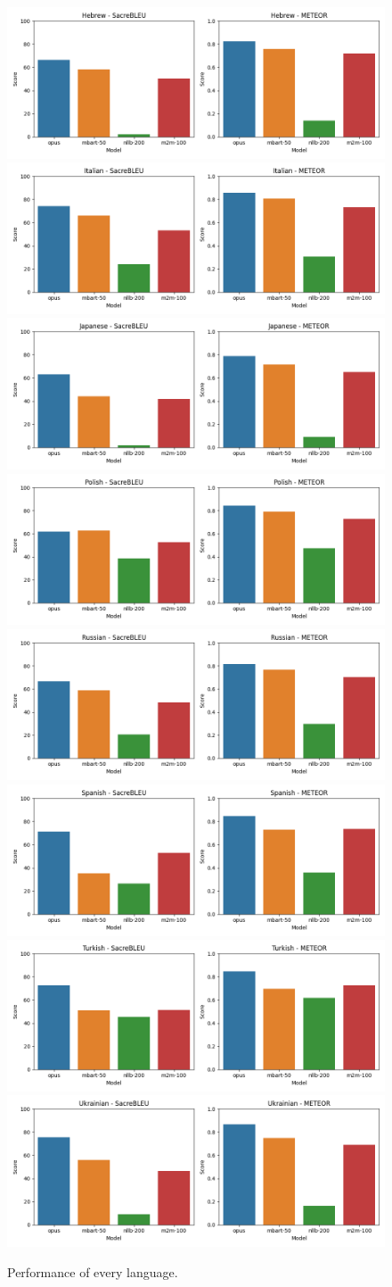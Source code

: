 \documentclass[a4paper]{article}
\begin{document}
\begin{figure}[htbp]
    \includegraphics[width=0.49\linewidth]{figures/hebrew_all_metrics.png}
    \includegraphics[width=0.49\linewidth]{figures/italian_all_metrics.png}
    \includegraphics[width=0.49\linewidth]{figures/japanese_all_metrics.png}
    \includegraphics[width=0.49\linewidth]{figures/polish_all_metrics.png}
    \includegraphics[width=0.49\linewidth]{figures/russian_all_metrics.png}
    \includegraphics[width=0.49\linewidth]{figures/spanish_all_metrics.png}
    \includegraphics[width=0.49\linewidth]{figures/turkish_all_metrics.png}
    \includegraphics[width=0.49\linewidth]{figures/ukrainian_all_metrics.png}
    \caption{Performance of every language.}
    \label{fig:lang_metrics}
\end{figure}
\end{document}
